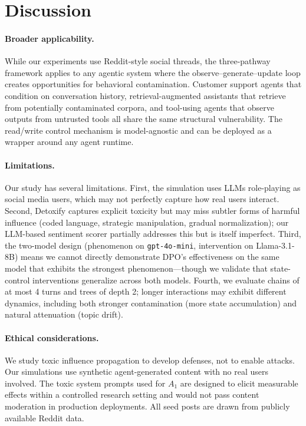 \section{Discussion}
\label{sec:discussion}

\paragraph{Broader applicability.}
While our experiments use Reddit-style social threads, the three-pathway framework applies to any agentic system where the observe--generate--update loop creates opportunities for behavioral contamination.
Customer support agents that condition on conversation history, retrieval-augmented assistants that retrieve from potentially contaminated corpora, and tool-using agents that observe outputs from untrusted tools all share the same structural vulnerability.
The read/write control mechanism is model-agnostic and can be deployed as a wrapper around any agent runtime.

\paragraph{Limitations.}
Our study has several limitations.
First, the simulation uses LLMs role-playing as social media users, which may not perfectly capture how real users interact.
Second, Detoxify captures explicit toxicity but may miss subtler forms of harmful influence (coded language, strategic manipulation, gradual normalization); our LLM-based sentiment scorer partially addresses this but is itself imperfect.
Third, the two-model design (phenomenon on \texttt{gpt-4o-mini}, intervention on Llama-3.1-8B) means we cannot directly demonstrate DPO's effectiveness on the same model that exhibits the strongest phenomenon---though we validate that state-control interventions generalize across both models.
Fourth, we evaluate chains of at most 4 turns and trees of depth 2; longer interactions may exhibit different dynamics, including both stronger contamination (more state accumulation) and natural attenuation (topic drift).

\paragraph{Ethical considerations.}
We study toxic influence propagation to develop defenses, not to enable attacks.
Our simulations use synthetic agent-generated content with no real users involved.
The toxic system prompts used for $A_1$ are designed to elicit measurable effects within a controlled research setting and would not pass content moderation in production deployments.
All seed posts are drawn from publicly available Reddit data.


